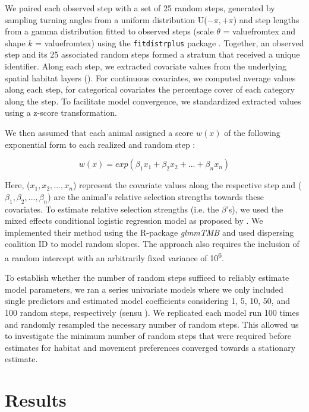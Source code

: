 \documentclass[abstract=on,10pt,a4paper,bibliography=totocnumbered]{article}
\begin{document}
We paired each observed step with a set of 25 random steps, generated by
sampling turning angles from  a uniform distribution U(\(-\pi, +\pi\)) and step
lengths from a gamma distribution fitted to observed steps (scale \(\theta\) =
valuefromtex and shape \(k\) = valuefromtex) using the \texttt{fitdistrplus}
package \citep{Delignette-Muller.2015}. Together, an observed step and its 25
associated random steps formed a stratum that received a unique identifier.
Along each step, we extracted covariate values from the underlying spatial
habitat layers (). For continuous covariates, we computed
average values along each step, for categorical covariates the percentage cover
of each category along the step. To facilitate model convergence, we
standardized extracted values using a z-score transformation.

We then assumed that each animal assigned a score \(w(x)\) of the following
exponential form to each realized and random step \citep{Fortin.2005}:

\begin{equation}
\label{EQ1}
  w(x) = exp(\beta_1 x_1 + \beta_2 x_2 + ... + \beta_n x_n)
\end{equation}

\noindent Here, (\(x_1, x_2, ..., x_n\)) represent the covariate values along
the respective step and (\(\beta_1, \beta_2, ..., \beta_n\)) are the animal's
relative selection strengths \citep{Avgar.2017} towards these covariates. To
estimate relative selection strengths (i.e. the \(\beta\)'s), we used the mixed
effects conditional logistic regression model as proposed by \cite{Muff.2020}.
We implemented their method using the R-package \textit{glmmTMB}
\citep{Brooks.2017} and used dispersing coalition ID to model random slopes. The
approach also requires the inclusion of a random intercept with an arbitrarily
fixed variance of 10\textsuperscript{6}.

To establish whether the number of random steps sufficed to reliably estimate
model parameters, we ran a series univariate models where we only included
single predictors and estimated model coefficients considering 1, 5, 10, 50, and
100 random steps, respectively (sensu \citealp{Fieberg.2020}). We replicated
each model run 100 times and randomly resampled the necessary number of random
steps. This allowed us to investigate the minimum number of random steps that
were required before estimates for habitat and movement preferences converged
towards a stationary estimate.

\section{Results}
\end{document}
